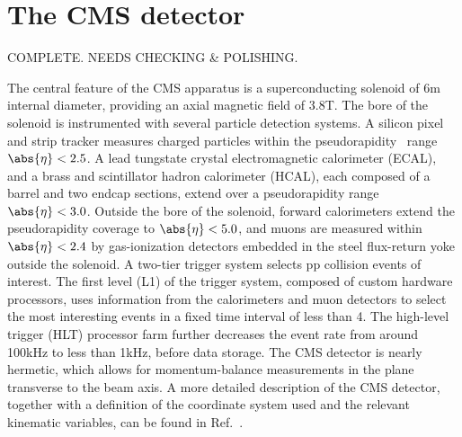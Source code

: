 \section{The CMS detector}
\label{sec:detector}

{\BF COMPLETE. NEEDS CHECKING \& POLISHING.}


The central feature of the CMS apparatus is a superconducting solenoid
of 6\unit{m} internal diameter, providing an axial magnetic field of
3.8\unit{T}. The bore of the solenoid is instrumented with several
particle detection systems. A silicon pixel and strip tracker measures
charged particles within the pseudorapidity~\cite{Chatrchyan:2008zzk}
range $\abs{\eta} < 2.5$.
A lead tungstate crystal electromagnetic calorimeter (ECAL), and a
brass and scintillator hadron calorimeter (HCAL), each composed of a
barrel and two endcap sections, extend over a pseudorapidity range
$\abs{\eta} < 3.0$. Outside the bore of the solenoid, forward
calorimeters extend the pseudorapidity coverage to $\abs{\eta} < 5.0$,
and muons are measured within $\abs{\eta} < 2.4$ by gas-ionization
detectors embedded in the steel flux-return yoke outside the
solenoid. A two-tier trigger system selects pp collision events of
interest. The first level (L1) of the trigger system, composed of
custom hardware processors, uses information from the calorimeters and
muon detectors to select the most interesting events in a fixed time
interval of less than 4\mus. The high-level trigger (HLT) processor
farm further decreases the event rate from around 100\unit{kHz} to
less than 1\unit{kHz}, before data storage. The CMS detector is nearly
hermetic, which allows for momentum-balance measurements in the plane
transverse to the beam axis. A more detailed description of the CMS
detector, together with a definition of the coordinate system used and
the relevant kinematic variables, can be found in
Ref.~\cite{Chatrchyan:2008zzk}.
